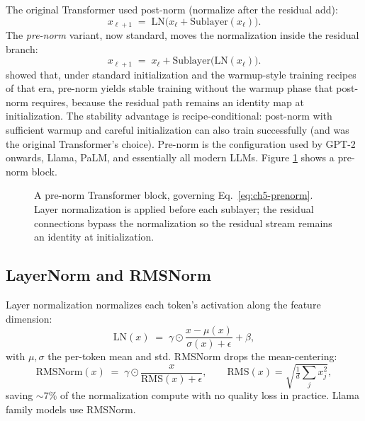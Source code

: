 The original Transformer used post-norm (normalize after the residual
add):
\begin{equation}
x_{\ell+1} \;=\; \mathrm{LN}\bigl(x_\ell + \mathrm{Sublayer}(x_\ell)\bigr).
\end{equation}
The \emph{pre-norm} variant, now standard, moves the normalization
inside the residual branch:
\begin{equation}
\label{eq:ch5-prenorm}
x_{\ell+1} \;=\; x_\ell + \mathrm{Sublayer}\bigl(\mathrm{LN}(x_\ell)\bigr).
\end{equation}
\citet{xiong2020onlayer} showed that, under standard initialization
and the warmup-style training recipes of that era, pre-norm yields
stable training without the warmup phase that post-norm requires,
because the residual path remains an identity map at initialization.
The stability advantage is recipe-conditional: post-norm with
sufficient warmup and careful initialization can also train
successfully (and was the original Transformer's choice). Pre-norm is the
configuration used by GPT-2 onwards, Llama, PaLM, and essentially all
modern LLMs. Figure \ref{fig:week4-block} shows a pre-norm block.

\begin{figure}[h]
\centering

\caption{A pre-norm Transformer block, governing
  Eq.~\eqref{eq:ch5-prenorm}. Layer normalization is applied before
  each sublayer; the residual connections bypass the normalization so
  the residual stream remains an identity at initialization.}
\label{fig:week4-block}
\end{figure}

\subsection{LayerNorm and RMSNorm}

Layer normalization \citep{ba2016layernorm} normalizes each token's
activation along the feature dimension:
\begin{equation}
\mathrm{LN}(x) \;=\; \gamma \odot \frac{x - \mu(x)}{\sigma(x) + \epsilon} + \beta,
\end{equation}
with $\mu, \sigma$ the per-token mean and std. RMSNorm
\citep{zhang2019rmsnorm} drops the mean-centering:
\begin{equation}
\label{eq:ch5-rmsnorm}
\mathrm{RMSNorm}(x) \;=\; \gamma \odot \frac{x}{\mathrm{RMS}(x) + \epsilon},
\qquad
\mathrm{RMS}(x) = \sqrt{\tfrac{1}{d}\sum_j x_j^2},
\end{equation}
saving $\sim\!7\%$ of the normalization compute with no quality loss
in practice. Llama family models use RMSNorm.

